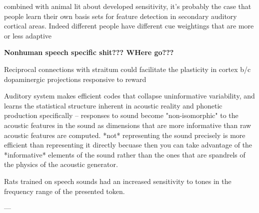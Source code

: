 


combined with animal lit about developed sensitivity, it's probably the case that people learn their own basis sets for feature detection in secondary auditory cortical areas. Indeed different people have different cue weightings that are more or less adaptive\cite{clayardsDifferencesCueWeights2018}

\textbf{Nonhuman speech specific shit??? WHere go???}



Reciprocal connections with straitum could facilitate the plasticity in cortex b/c dopaminergic projections responsive to reward \cite{fengRoleHumanAuditory2018}

Auditory system makes efficient codes that collapse uninformative variability, and learns the statistical structure inherent in acoustic reality \cite{schiavoCapacitiesNeuralMechanisms2019} and phonetic production specifically\cite{kuhlNewViewLanguage2000} -- responses to sound become "non-isomorphic" to the acoustic features in the sound \cite{stilpEfficientCodingStatistically2012,wangNeuralCodingStrategies2007} as dimensions that are more informative than raw acoustic features are computed. *not* representing the sound precisely is more efficient than representing it directly becuase then you can take advantage of the *informative* elements of the sound rather than the ones that are spandrels of the physics of the acoustic generator.

Rats trained on speech sounds had an increased sensitivity to tones in the frequency range of the presented token\cite{engineerSpeechTrainingAlters2015a}.


---



